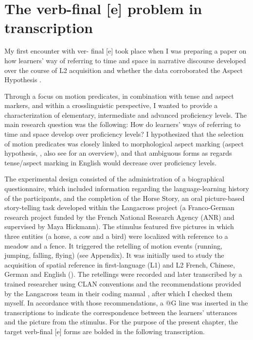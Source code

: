 \documentclass[output=paper,colorlinks,citecolor=brown,modfonts,nonflat]{../langscibook}
\begin{document}
\section{The verb-final [e] problem in transcription}%

My first encounter with ver- final [e] took place when I was preparing a paper on how learners’ way of referring to time and space in narrative discourse developed over the course of L2 acquisition and whether the data corroborated the Aspect Hypothesis \citep{Leclercq2011}.

Through a focus on motion predicates, in combination with tense and aspect markers, and within a crosslinguistic perspective, I wanted to provide a characterization of elementary, intermediate and advanced proficiency levels. The main research question was the following: How do learners’ ways of referring to time and space develop over proficiency levels? I hypothesized that the selection of motion predicates was closely linked to morphological aspect marking (aspect hypothesis, \citealt{AndersenShirai1994,Robison1995}, also see \citealt{Rohde1996} for an overview), and that ambiguous forms as regards tense/aspect marking in English would decrease over proficiency levels.

The experimental design consisted of the administration of a biographical questionnaire, which included information regarding the language-learning history of the participants, and the completion of the Horse Story, an oral picture-based story-telling task developed within the Langacross project (a Franco-German research project funded by the French National Research Agency (ANR) and supervised by Maya Hickmann). The stimulus featured five pictures in which three entities (a horse, a cow and a bird) were localized with reference to a meadow and a fence. It triggered the retelling of motion events (running, jumping, falling, flying) (see Appendix). It was initially used to study the acquisition of spatial reference in first-language (L1) and L2 French, Chinese, German and English (\citealt{Hendriks1998,HickmannEtAl1998}). The retellings were recorded and later transcribed by a trained researcher using CLAN conventions and the recommendations provided by the Langacross team in their coding manual \citep{HickmannEtAl2011}, after which I checked them myself. In accordance with those recommendations, a @G line was inserted in the transcriptions to indicate the correspondence between the learners’ utterances and the picture from the stimulus. For the purpose of the present chapter, the target verb-final [e] forms are bolded in the following transcription.
\end{document}
